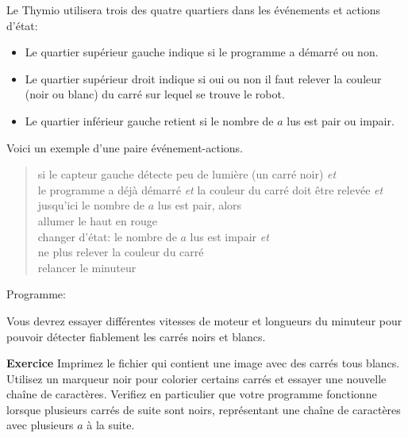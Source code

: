 Le Thymio utilisera trois des quatre quartiers dans les événements et actions d'état:

\begin{itemize}
\item Le quartier supérieur gauche indique si le programme a démarré ou non.
\item Le quartier supérieur droit indique si oui ou non il faut relever la couleur (noir ou blanc) 
du carré sur lequel se trouve le robot.
\item Le quartier inférieur gauche retient si le nombre de $a$ lus est pair ou impair.
\end{itemize}

Voici un exemple d'une paire événement-actions.


\begin{quote}
si le capteur gauche détecte peu de lumière (un carré noir) \emph{et}\\
\hspace*{1em} le programme a déjà démarré \emph{et}
la couleur du carré doit être relevée \emph{et}\\
\hspace*{1em} jusqu'ici le nombre de $a$ lus est pair, alors\\
\hspace*{2em} allumer le haut en rouge\\
\hspace*{2em} changer d'état: le nombre de $a$ lus est impair \emph{et}\\
\hspace*{4em} ne plus relever la couleur du carré\\
\hspace*{2em} relancer le minuteur
\end{quote}

{\raggedleft \hfill Programme: }

Vous devrez essayer différentes vitesses de moteur et longueurs du minuteur
pour pouvoir détecter fiablement les carrés noirs et blancs.

\textbf{Exercice}
Imprimez le fichier  qui contient une image avec des carrés tous blancs.
Utilisez un marqueur noir pour colorier certains carrés et essayer une nouvelle chaîne de caractères.
Verifiez en particulier que votre programme fonctionne lorsque plusieurs carrés de suite sont noirs,
représentant une chaîne de caractères avec plusieurs $a$ à la suite.

